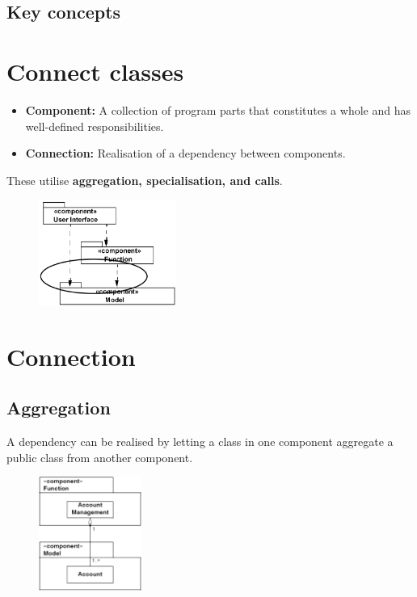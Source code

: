 \subsection{Key concepts}

\section{Connect classes}
\begin{itemize}
    \item \textbf{Component:} A collection of program parts that constitutes a whole and has well-defined responsibilities.
    \item \textbf{Connection:} Realisation of a dependency between components.
\end{itemize}

These utilise \textbf{aggregation, specialisation, and calls}.

\begin{figure}[H]
    \centering
   \includegraphics[width=0.4\textwidth]{figures/connectclasses.png}
\end{figure}

\section{Connection}
\subsection{Aggregation}

A dependency can be realised by letting a class in one component aggregate a public class from another component.

\begin{figure}[H]
    \centering
   \includegraphics[width=0.3\textwidth]{figures/connectionaggregation.png}
\end{figure}

